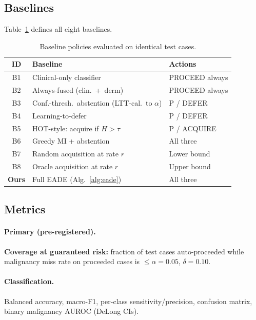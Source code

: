 \documentclass[conference]{IEEEtran}
\newcommand{\1}{\mathbf{1}}
\begin{document}
\subsection{Baselines}

Table~\ref{tab:baselines} defines all eight baselines.

\begin{table}[H]
  \centering
  \caption{Baseline policies evaluated on identical test cases.}
  \label{tab:baselines}
  \renewcommand{\arraystretch}{1.2}
  \small
  \begin{tabular}{clp{3.0cm}}
    \toprule
    \textbf{ID} & \textbf{Baseline} & \textbf{Actions} \\
    \midrule
    B1 & Clinical-only classifier & PROCEED always \\
    B2 & Always-fused (clin.~+~derm) & PROCEED always \\
    B3 & Conf.-thresh.\ abstention (LTT-cal.\ to $\alpha$) & P / DEFER \\
    B4 & Learning-to-defer \cite{mozannar2020defer} & P / DEFER \\
    B5 & HOT-style: acquire if $H>\tau$ & P / ACQUIRE \\
    B6 & Greedy MI + abstention & All three \\
    B7 & Random acquisition at rate $r$ & Lower bound \\
    B8 & Oracle acquisition at rate $r$ & Upper bound \\
    \midrule
    \textbf{Ours} & Full EADE (Alg.~\ref{alg:eade}) & All three \\
    \bottomrule
  \end{tabular}
\end{table}

\subsection{Metrics}

\paragraph{Primary (pre-registered).} \textbf{Coverage at guaranteed risk:}
fraction of test cases auto-proceeded while malignancy miss rate on
proceeded cases is $\leq\alpha=0.05$, $\delta=0.10$.

\paragraph{Classification.} Balanced accuracy, macro-F1, per-class
sensitivity/precision, confusion matrix, binary malignancy AUROC (DeLong CIs).
\end{document}
